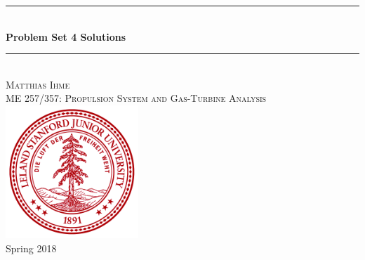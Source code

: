 \documentclass[12pt]{article}
\begin{document}

\begin{titlepage}

\newcommand{\ddz}[1]{\frac{\mathrm{d} #1}{\mathrm{d} z}}
\newcommand{\HRule}{\rule{\linewidth}{0.5mm}} %

\center %
 

 




\HRule \\[1 cm]
{ \huge \bfseries Problem Set 4 Solutions}\\[0.4cm] %
\HRule \\[2cm]
 

\Large  \textsc{Matthias Ihme}\\[2cm] %
\textsc{\large ME 257/357: Propulsion System and Gas-Turbine Analysis}\\[2cm] %

\includegraphics[width=50mm]{stanford_seal.png}\\[2cm] %
{\large Spring 2018}%


\end{titlepage}
\end{document}
